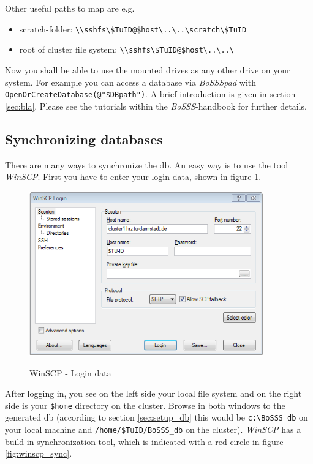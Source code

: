 \documentclass[11pt,twoside,a4paper]{fdyartcl}
\newcommand{\Bosss}{\textit{BoSSS}}
\begin{document}
Other useful paths to map are e.g.
\begin{itemize}
	\item[] scratch-folder: \verb|\\sshfs\$TuID@$host\..\..\scratch\$TuID|
	\item[] root of cluster file system: \verb|\\sshfs\$TuID@$host\..\..\|
\end{itemize}

Now you shall be able to use the mounted drives as any other drive on your system. For example you can access a database via \emph{BoSSSpad} with \verb|OpenOrCreateDatabase(@"$DBpath")|. A brief introduction is given in section \ref{sec:bla}. Please see the tutorials within the \Bosss-handbook for further details.

\subsection{Synchronizing databases}
\label{sec:synchronize_db}
There are many ways to synchronize the db. An easy way is to use the tool \emph{WinSCP}. First you have to enter your login data, shown in figure \ref{fig:winscp_login}.
\begin{figure}[h] %
  \begin{centering}
  \includegraphics[width=0.9\textwidth]{Figures/winscp_login.png}\\
  \end{centering}
  \caption{WinSCP - Login data}\label{fig:winscp_login}
\end{figure} %
After logging in, you see on the left side your local file system and on the right side is your \verb|$home| directory on the cluster. Browse in both windows to the generated db (according to section \ref{sec:setup_db} this would be \verb|c:\BoSSS_db| on your local machine and \verb|/home/$TuID/BoSSS_db| on the cluster). \emph{WinSCP} has a build in synchronization tool, which is indicated with a red circle in figure \ref{fig:winscp_sync}.
\end{document}
